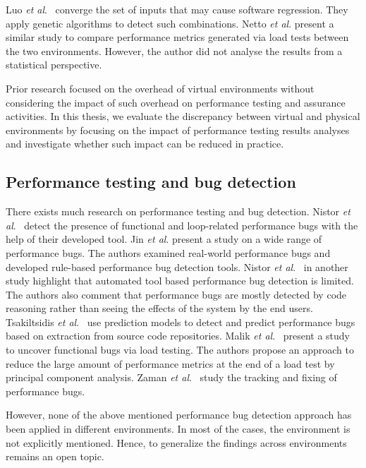 Luo \textit{et al$.$}~\cite{Luo:2016:MPR:2901739.2901765} converge the set of inputs that may cause software regression. They apply genetic algorithms to detect such combinations. Netto \textit{et al$.$} \cite{netto2011evaluating} present a similar study to compare performance metrics generated via load tests between the two environments. However, the author did not analyse the results from a statistical perspective.

Prior research focused on the overhead of virtual environments without considering the impact of such overhead on performance testing and assurance activities. In this thesis, we evaluate the discrepancy between virtual and physical environments by focusing on the impact of performance testing results analyses and investigate whether such impact can be reduced in practice.


\subsection{Performance testing and bug detection}

There exists much research on performance testing and bug detection. Nistor \textit{et al$.$}~\cite{Nistor} detect the presence of functional and loop-related performance bugs with the help of their developed tool. Jin \textit{et al$.$} \cite{Jin} present a study on a wide range of performance bugs. The authors examined real-world performance bugs and developed rule-based performance bug detection tools. Nistor \textit{et al$.$}~\cite{nistor_2} in another study highlight that automated tool based performance bug detection is limited. The authors also comment that performance bugs are mostly detected by code reasoning rather than seeing the effects of the system by the end users. Tsakiltsidis \textit{et al$.$}~\cite{Tsakiltsidis} use prediction models to detect and predict performance bugs based on extraction from source code repositories. Malik \textit{et al$.$}~\cite{h_malik_p_bugs} present a study to uncover functional bugs via load testing. The authors propose an approach to reduce the large amount of performance metrics at the end of a load test by principal component analysis. Zaman \textit{et al$.$}~\cite{zaman_p_bugs} study the tracking and fixing of performance bugs.

However, none of the above mentioned performance bug detection approach has been applied in different environments. In most of the cases, the environment is not explicitly mentioned. Hence, to generalize the findings across environments remains an open topic.
